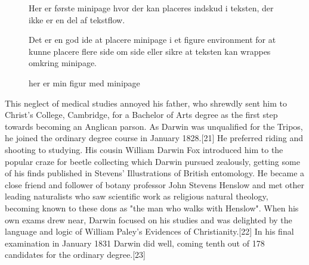\documentclass{article}%
\begin{document}
\begin{figure}[h]%
\centering
\begin{minipage}[t]{0.4\textwidth}%
Her er første minipage hvor der kan placeres indskud i teksten, der ikke er en del af tekstflow.\end{minipage}
\hspace{1cm}%
\begin{minipage}[t]{0.4\textwidth}
Det er en god ide at placere minipage i et figure environment for at kunne placere flere side om side eller sikre at teksten kan wrappes omkring minipage.
\end{minipage}
\caption{her er min figur med minipage}
\label{fig1}
\end{figure}

This neglect of medical studies annoyed his father, who shrewdly sent him to Christ's College, Cambridge, for a Bachelor of Arts degree as the first step towards becoming an Anglican parson. As Darwin was unqualified for the Tripos, he joined the ordinary degree course in January 1828.[21] He preferred riding and shooting to studying.
His cousin William Darwin Fox introduced him to the popular craze for beetle collecting which Darwin pursued zealously, getting some of his finds published in Stevens' Illustrations of British entomology. 
He became a close friend and follower of botany professor John Stevens Henslow and met other leading naturalists who saw scientific work as religious natural theology, becoming known to these dons as "the man who walks with Henslow". When his own exams drew near, Darwin focused on his studies and was delighted by the language and logic of William Paley's Evidences of Christianity.[22] In his final examination in January 1831 Darwin did well, coming tenth out of 178 candidates for the ordinary degree.[23]
\end{document}
